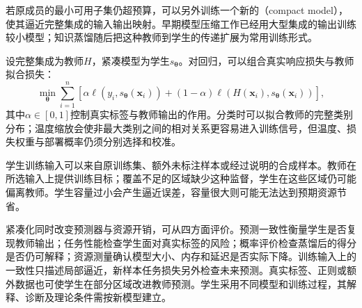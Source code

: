 若原成员的最小可用子集仍超预算，可以另外训练一个新的（compact model），使其逼近完整集成的输入输出映射。早期模型压缩工作已经用大型集成的输出训练较小模型；知识蒸馏随后把这种教师到学生的传递扩展为常用训练形式。

设完整集成为教师$H$，紧凑模型为学生$s_{\bm{\theta}}$。对回归，可以组合真实响应损失与教师拟合损失：
\begin{equation}
  \min_{\bm{\theta}}
  \sum_{i=1}^{n}
  \left[
    \alpha\ell\!\left(y_i,s_{\bm{\theta}}(\bm{x}_i)\right)
    +(1-\alpha)
    \ell\!\left(H(\bm{x}_i),s_{\bm{\theta}}(\bm{x}_i)\right)
  \right],
  \label{eq:ensemble-compression-objective}
\end{equation}
其中$\alpha\in[0,1]$控制真实标签与教师输出的作用。分类时可以拟合教师的完整类别分布；温度缩放会使非最大类别之间的相对关系更容易进入训练信号，但温度、损失权重与部署概率仍须分别选择和校准。

学生训练输入可以来自原训练集、额外未标注样本或经过说明的合成样本。教师在所选输入上提供训练目标；覆盖不足的区域缺少这种监督，学生在这些区域仍可能偏离教师。学生容量过小会产生逼近误差，容量很大则可能无法达到预期资源节省。

紧凑化同时改变预测器与资源开销，可从四方面评价。预测一致性衡量学生是否复现教师输出；任务性能检查学生面对真实标签的风险；概率评价检查蒸馏后的得分是否仍可解释；资源测量确认模型大小、内存和延迟是否实际下降。训练输入上的一致性只描述局部逼近，新样本任务损失另外检查未来预测。真实标签、正则或额外数据也可使学生在部分区域改进教师预测。学生采用不同模型和训练过程，其解释、诊断及理论条件需按新模型建立。
